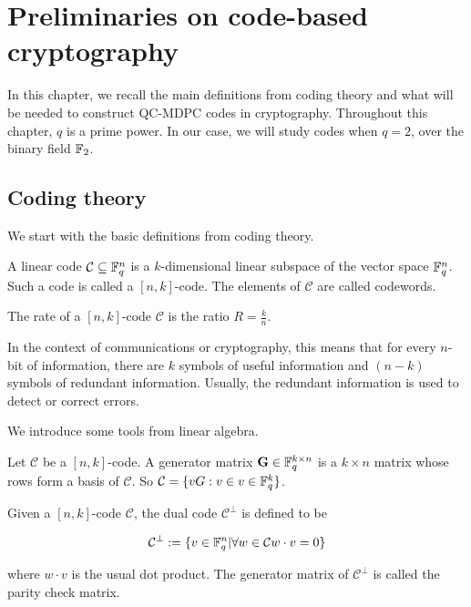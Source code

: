 \section{Preliminaries on code-based cryptography}

In this chapter, we recall the main definitions from coding theory and what will be needed to construct QC-MDPC codes in cryptography. Throughout this chapter, $q$ is a prime power. In our case, we will study codes when $q=2$, over the binary field $\mathbb{F}_2$.

\subsection{Coding theory}
We start with the basic definitions from coding theory.

\begin{defn}
A linear code $\mathcal{C} \subseteq \mathbb{F}_q^n$ is a $k$-dimensional linear subspace of the vector space $\mathbb{F}_q^n$. Such a code is called a $[n,k]$-code. The elements of $\mathcal{C}$ are called codewords.
\end{defn}

\begin{defn}
The rate of a $[n,k]$-code $\mathcal{C}$ is the ratio $ R = \frac{k}{n}$.

In the context of communications or cryptography, this means that for every $n$-bit of information, there are $k$ symbols of useful information and $(n-k)$ symbols of redundant information. Usually, the redundant information is used to detect or correct errors.
\end{defn}

We introduce some tools from linear algebra.

\begin{defn}
Let $\mathcal{C}$ be a $[n,k]$-code. A generator matrix $\mathbf{G} \in \mathbb{F}_q^{k \times n}$ is a $k \times n$ matrix whose rows form a basis of $\mathcal{C}$. So $\mathcal{C} = \{ vG: v \in v \in \mathbb{F}_q^k\}$.
\end{defn}

\begin{defn}
Given a $[n,k]$-code $\mathcal{C}$, the dual code $\mathcal{C}^\perp$ is defined to be

\[
\mathcal{C}^\perp := \{ v \in \mathbb{F}_q^n | \forall w \in \mathcal{C} w \cdot v = 0 \}   
\]

where $ w \cdot v $ is the usual dot product. The generator matrix of $\mathcal{C}^\perp$ is called the parity check matrix.
\end{defn}

